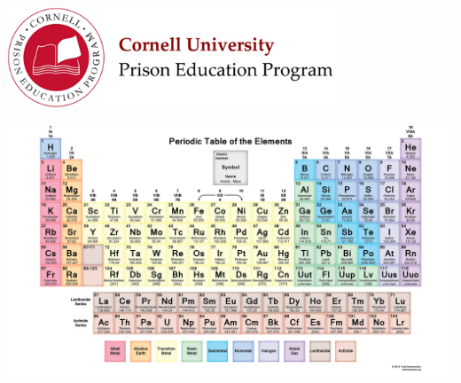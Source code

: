 \documentclass[12pt]{exam}
\begin{document}

\begin{flushright}
\vspace{0.2in}

\end{flushright}

\begin{center}
\includegraphics[width=10cm]{../images/logo.png}
\end{center}

\begin{center}
\end{center}

\vspace{0.2in}


\begin{center}
\noindent\includegraphics[width=\textwidth]{../images/periodicTable.png}
\end{center}
\end{document}
